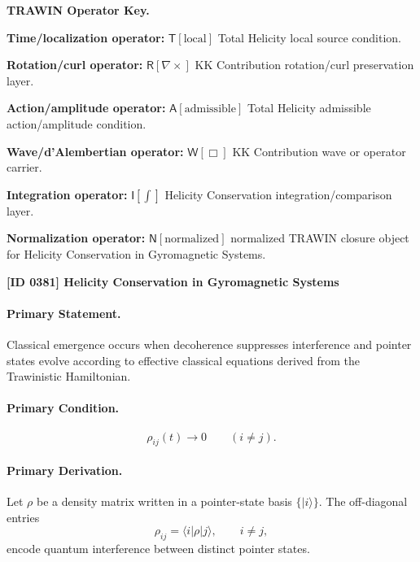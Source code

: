 \par\vspace{0.45\baselineskip}
\noindent\begin{minipage}[t]{\linewidth}
\begingroup
\small
\raggedright
\textbf{TRAWIN Operator Key.}\par
\noindent\textbf{Time/localization operator:} $\mathsf{T}\!\left[\mathrm{local}\right]$ Total Helicity local source condition.\par
\noindent\textbf{Rotation/curl operator:} $\mathsf{R}\!\left[\nabla\times\right]$ KK Contribution rotation/curl preservation layer.\par
\noindent\textbf{Action/amplitude operator:} $\mathsf{A}\!\left[\mathrm{admissible}\right]$ Total Helicity admissible action/amplitude condition.\par
\noindent\textbf{Wave/d'Alembertian operator:} $\mathsf{W}\!\left[\Box\right]$ KK Contribution wave or operator carrier.\par
\noindent\textbf{Integration operator:} $\mathsf{I}\!\left[\int\right]$ Helicity Conservation integration/comparison layer.\par
\noindent\textbf{Normalization operator:} $\mathsf{N}\!\left[\mathrm{normalized}\right]$ normalized TRAWIN closure object for Helicity Conservation in Gyromagnetic Systems.\par
\endgroup
\end{minipage}

\clearpage
\noindent\textbf{[ID 0381] Helicity Conservation in Gyromagnetic Systems}\par
\vspace{0.35em}
\paragraph{Primary Statement.}
Classical emergence occurs when decoherence suppresses interference and pointer states evolve according to effective classical equations derived from the Trawinistic Hamiltonian.

\paragraph{Primary Condition.}
\begin{equation}
\rho_{ij}(t)\rightarrow 0
\qquad
(i\neq j).
\end{equation}

\paragraph{Primary Derivation.}
Let $\rho$ be a density matrix written in a pointer-state basis $\{|i\rangle\}$.  
The off-diagonal entries
\begin{equation}
\rho_{ij}
=
\langle i|\rho|j\rangle,
\qquad i\neq j,
\end{equation}
encode quantum interference between distinct pointer states.

